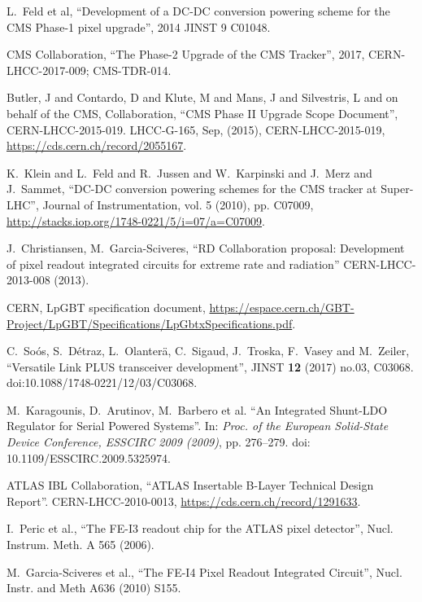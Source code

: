 \begin{thebibliography}{1}
% 
 L.~Feld et al, ``Development of a DC-DC conversion powering scheme for the CMS Phase-1 pixel upgrade'', 2014 JINST 9 C01048.

 CMS Collaboration, ``The Phase-2 Upgrade of the CMS
  Tracker'', 2017, CERN-LHCC-2017-009; CMS-TDR-014.

 Butler, J and Contardo, D and Klute, M and Mans, J and
                       Silvestris, L and on behalf of the CMS, Collaboration,
      ``CMS Phase II Upgrade Scope Document'',
      CERN-LHCC-2015-019. LHCC-G-165,
      Sep, (2015),
      CERN-LHCC-2015-019, \url{https://cds.cern.ch/record/2055167}.

K.~Klein and L.~Feld and R.~Jussen and W.~Karpinski and J.~Merz and J.~Sammet, ``DC-DC conversion powering schemes for the CMS tracker at Super-LHC'', Journal of Instrumentation, vol. 5 (2010), pp. C07009, \url{http://stacks.iop.org/1748-0221/5/i=07/a=C07009}.

 J.~Christiansen, M.~Garcia-Sciveres, ``RD Collaboration proposal: Development of pixel readout integrated circuits for extreme rate and radiation''
CERN-LHCC-2013-008 (2013).

 CERN, LpGBT specification document,
\url{https://espace.cern.ch/GBT-Project/LpGBT/Specifications/LpGbtxSpecifications.pdf}.

 C.~Soós, S.~Détraz, L.~Olanterä, C.~Sigaud, J.~Troska, F.~Vasey and M.~Zeiler, ``Versatile Link PLUS transceiver development'', JINST {\bf 12} (2017) no.03,  C03068. doi:10.1088/1748-0221/12/03/C03068.


 M.~Karagounis, D.~Arutinov, M.~Barbero et al. ``An Integrated Shunt-LDO Regulator for Serial Powered Systems''. In: \textit{Proc. of the European Solid-State Device Conference,
ESSCIRC 2009 (2009)}, pp. 276–279. doi: 10.1109/ESSCIRC.2009.5325974.


 ATLAS IBL Collaboration, ``ATLAS Insertable B-Layer
  Technical Design Report''. CERN-LHCC-2010-0013, \url{https://cds.cern.ch/record/1291633}.
 


 I.~Peric et al., ``The FE-I3 readout chip for the ATLAS pixel detector'', Nucl. Instrum. Meth. A 565 (2006).

 M.~Garcia-Sciveres et al., ``The FE-I4 Pixel Readout
  Integrated Circuit'', Nucl. Instr. and Meth A636 (2010) S155.


\end{thebibliography}
